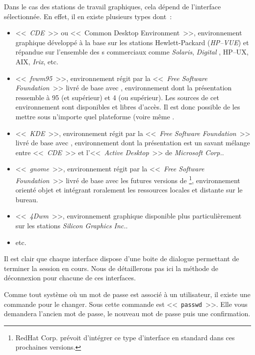 Dans le cas des stations de travail graphiques, cela d{\'e}pend de l'interface
s{\'e}lectionn{\'e}e. En effet, il en existe plusieurs types dont~:
\begin{itemize}
	\item	<<~{\sl CDE}~>> ou <<~Common Desktop Environment~>>, environnement
			graphique d{\'e}velopp{\'e} {\`a} la base sur les stations Hewlett-Packard
			({\sl HP--VUE}) et r{\'e}pandue sur l'ensemble des {\Unix}s commerciaux
			comme {\sl Solaris}, {\sl Digital {\Unix}}, {\sf HP--UX},
			{\sf AIX}, {\sl Irix}, etc.
	\item	<<~{\sl fvwm95}~>>, environnement r{\'e}git par la <<~{\sl Free Software
			Foundation}~>> livr{\'e} de base avec {\Linux}, environnement
			dont la pr{\'e}sentation ressemble {\`a} {\Windows}95 (et sup{\'e}rieur)
			et {\WindowsNT} 4 (ou sup{\'e}rieur). Les sources de cet environnement
			sont disponibles et libres d'acc{\`e}s. Il est donc possible
			de les mettre sous n'importe quel plateforme {\Unix} (voire
			m{\^e}me {\OpenVMS}.
	\item	<<~{\sl KDE}~>>, environnement r{\'e}git par la <<~{\sl Free Software
			Foundation}~>> livr{\'e} de base avec {\Linux}, environnement
			dont la pr{\'e}sentation est un savant m{\'e}lange entre <<~{\sl CDE}~>>
			et l'<<~{\sl Active Desktop}~>> de {\sl Microsoft Corp.}.
	\item	<<~{\sl gnome}~>>, environnement r{\'e}git par la <<~{\sl Free Software
			Foundation}~>> livr{\'e} de base avec les futures versions de
			{\Linux}\footnote{RedHat Corp. pr{\'e}voit d'int{\'e}grer ce type
			d'interface en standard dans ces prochaines versions.},
			environnement orient{\'e} objet et int{\'e}grant roralement les ressources
			locales et distante sur le bureau.
	\item	<<~{\sl 4Dwm}~>>, environnement graphique disponible plus
			particuli{\`e}rement sur les stations {\sl Silicon Graphics Inc.}.
	\item	etc.
\end{itemize}

Il est clair que chaque interface dispose d'une boite de dialogue permettant
de terminer la session en cours. Nous de d{\'e}taillerons pas ici la m{\'e}thode
de d{\'e}connexion pour chacune de ces interfaces.

Comme tout syst{\`e}me o{\`u} un mot de passe est associ{\'e} {\`a} un utilisateur, il existe
une commande pour le changer. Sous {\Unix} cette commande est <<~{\tt passwd}~>>.
Elle vous demandera l'ancien mot de passe, le nouveau mot de passe puis une
confirmation.

